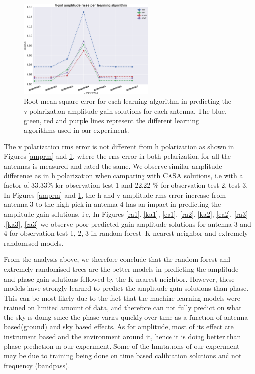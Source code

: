 \begin{figure}[H]
  \centering
    \includegraphics[width=0.6\textwidth]{images/Vpol-amp.eps}
    \caption{Root mean square error for each learning algorithm in predicting the v polarization amplitude gain solutions for each antenna. The blue, green, red and purple lines represent the different learning algorithms used in our experiment.}
  \label{amprmv}
 \end{figure} 

The v polarization rms error is not different from h polarization as shown in Figures \ref{amprm} and \ref{amprmv}, where the rms error in both polarization for all the antennas is measured and rated the same. We observe similar amplitude  difference as in h polarization when camparing with CASA solutions, i.e with a factor of 33.33$\%$ for observation test-1 and 22.22 $\%$ for observation test-2, test-3. In Figures \ref{amprm} and \ref{amprmv}, the h and v amplitude rms error increase from antenna 3 to the high pick in antenna 4 has an impact in predicting the amplitude gain solutions. i.e, In Figures \ref{ra1}, \ref{ka1}, \ref{ea1}, \ref{ra2}, \ref{ka2}, \ref{ea2}, \ref{ra3} ,\ref{ka3}, \ref{ea3} we observe poor predicted gain amplitude solutions for antenna 3 and 4 for observation test-1, 2, 3 in random forest, K-nearest neighbor and extremely randomised models.

From the analysis above, we therefore conclude that the random forest and extremely randomised trees are the better models in predicting the amplitude and phase gain solutions followed by the K-nearest neighbor. However, these models have strongly learned to predict the amplitude gain solutions than phase. This can be most likely due to the fact that the machine learning models were trained on limited amount of data, and therefore can not fully predict on what the sky is doing since the phase varies quickly over time as a function of antenna based(ground) and sky based effects.  As for amplitude, most of its effect are instrument based and the environment around it, hence it is doing better than phase prediction in our experiment. Some of the limitations of our experiment may be due to training being done on time based calibration solutions and not frequency (bandpass). 

